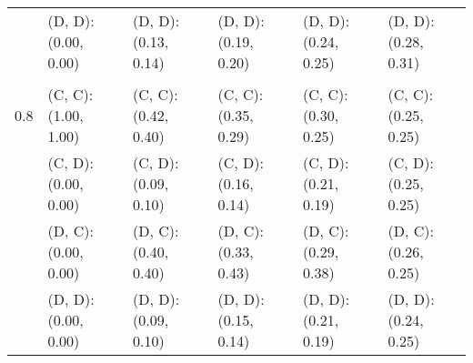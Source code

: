 \begin{tabular}{ l | l l l l l }
 & (D, D): (0.00, 0.00) & (D, D): (0.13, 0.14) & (D, D): (0.19, 0.20) & (D, D): (0.24, 0.25) & (D, D): (0.28, 0.31) \\ 
\\
0.8 & (C, C): (1.00, 1.00) & (C, C): (0.42, 0.40) & (C, C): (0.35, 0.29) & (C, C): (0.30, 0.25) & (C, C): (0.25, 0.25) \\ 
 & (C, D): (0.00, 0.00) & (C, D): (0.09, 0.10) & (C, D): (0.16, 0.14) & (C, D): (0.21, 0.19) & (C, D): (0.25, 0.25) \\ 
 & (D, C): (0.00, 0.00) & (D, C): (0.40, 0.40) & (D, C): (0.33, 0.43) & (D, C): (0.29, 0.38) & (D, C): (0.26, 0.25) \\ 
 & (D, D): (0.00, 0.00) & (D, D): (0.09, 0.10) & (D, D): (0.15, 0.14) & (D, D): (0.21, 0.19) & (D, D): (0.24, 0.25) \\ 
\end{tabular}

